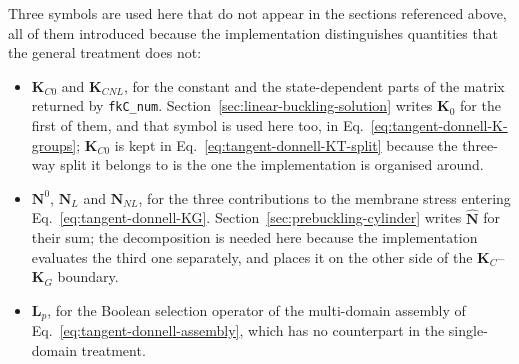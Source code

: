 Three symbols are used here that do not appear in the sections referenced above, all of them introduced because the implementation distinguishes quantities that the general treatment does not:

\begin{itemize}
	\item $\boldsymbol{K}_{C0}$ and $\boldsymbol{K}_{CNL}$, for the constant and the state-dependent parts of the matrix returned by \texttt{fkC\_num}. Section~\ref{sec:linear-buckling-solution} writes $\boldsymbol{K}_0$ for the first of them, and that symbol is used here too, in Eq.~\ref{eq:tangent-donnell-K-groups}; $\boldsymbol{K}_{C0}$ is kept in Eq.~\ref{eq:tangent-donnell-KT-split} because the three-way split it belongs to is the one the implementation is organised around.
	\item $\boldsymbol{N}^0$, $\boldsymbol{N}_L$ and $\boldsymbol{N}_{NL}$, for the three contributions to the membrane stress entering Eq.~\ref{eq:tangent-donnell-KG}. Section~\ref{sec:prebuckling-cylinder} writes $\widehat{\boldsymbol{N}}$ for their sum; the decomposition is needed here because the implementation evaluates the third one separately, and places it on the other side of the $\boldsymbol{K}_C$--$\boldsymbol{K}_G$ boundary.
	\item $\boldsymbol{L}_p$, for the Boolean selection operator of the multi-domain assembly of Eq.~\ref{eq:tangent-donnell-assembly}, which has no counterpart in the single-domain treatment.
\end{itemize}
